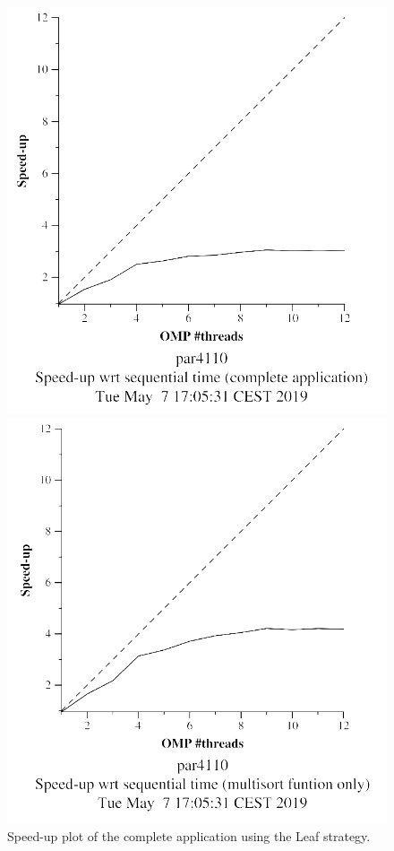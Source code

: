 \documentclass[12pt, a4paper]{article}
\begin{document}
\begin{figure}[H]
\centering
\begin{minipage}[b]{0.4\linewidth}
  \centering
  \includegraphics[scale=0.5]{./S2/S2_strong_scalability/multisort-omp-strong_boada-2_leaf_complete_application}
  \caption{Speed-up plot of the complete application using the Leaf strategy.}
  \label{fig:mandel-omp-10000-strong-21-time}
\end{minipage}%
\hspace{0.5cm}
\begin{minipage}[b]{0.4\linewidth}
  \centering
  \includegraphics[scale=0.5]{./S2/S2_strong_scalability/multisort-omp-strong_boada-2_leaf_multisort_only}

\end{minipage}
\end{figure}
\end{document}
